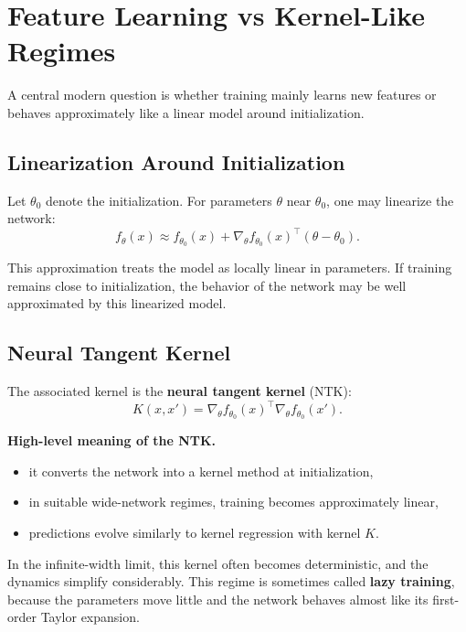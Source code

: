 \section{Feature Learning vs Kernel-Like Regimes}

A central modern question is whether training mainly learns new features or behaves approximately like a linear model around initialization.

\subsection{Linearization Around Initialization}

Let \(\theta_0\) denote the initialization. For parameters \(\theta\) near \(\theta_0\), one may linearize the network:
\[
f_\theta(x)
\approx
f_{\theta_0}(x)
+
\nabla_\theta f_{\theta_0}(x)^\top (\theta-\theta_0).
\]

\medskip

\noindent
This approximation treats the model as locally linear in parameters. If training remains close to initialization, the behavior of the network may be well approximated by this linearized model.

\subsection{Neural Tangent Kernel}

The associated kernel is the \textbf{neural tangent kernel} (NTK):
\[
K(x,x')
=
\nabla_\theta f_{\theta_0}(x)^\top
\nabla_\theta f_{\theta_0}(x').
\]

\medskip

\noindent
\textbf{High-level meaning of the NTK.}
\begin{itemize}
    \item it converts the network into a kernel method at initialization,
    \item in suitable wide-network regimes, training becomes approximately linear,
    \item predictions evolve similarly to kernel regression with kernel \(K\).
\end{itemize}

\medskip

\noindent
In the infinite-width limit, this kernel often becomes deterministic, and the dynamics simplify considerably. This regime is sometimes called \textbf{lazy training}, because the parameters move little and the network behaves almost like its first-order Taylor expansion.


